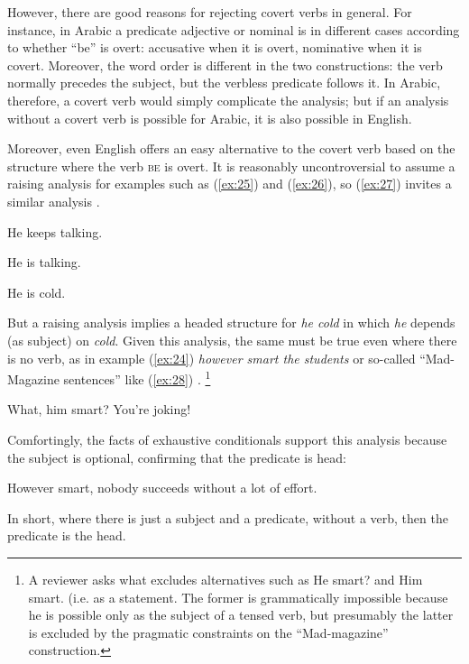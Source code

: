 \documentclass[output=paper]{langscibook}
\begin{document}
However, there are good reasons for rejecting covert verbs in general. For instance, in Arabic a predicate adjective or nominal is in different cases according to whether ``be'' is overt: accusative when it is overt, nominative when it is covert. Moreover, the word order is different in the two constructions: the verb normally precedes the subject, but the verbless predicate follows it. In Arabic, therefore, a covert verb would simply complicate the analysis; but if an analysis without a covert verb is possible for Arabic, it is also possible in English.

Moreover, even English offers an easy alternative to the covert verb based on the structure where the verb \textsc{be} is overt. It is reasonably uncontroversial to assume a raising analysis for examples such as (\ref{ex:25}) and (\ref{ex:26}), so (\ref{ex:27}) invites a similar analysis \citep{MuellerCopula}.

\eal
\ex \label{ex:25} He keeps talking.

\ex \label{ex:26} He is talking.

\ex \label{ex:27} He is cold.
\zl

But a raising analysis implies a headed structure for \emph{he cold} in which \emph{he} depends (as subject) on \emph{cold}. Given this analysis, the same must be true even where there is no verb, as in example (\ref{ex:24}) \emph{however smart the students} or so-called ``Mad-Magazine sentences'' like (\ref{ex:28}) \citep{Lambrecht:90}.%
%
\footnote{A reviewer asks what excludes alternatives such as He smart? and Him smart. (i.e. as a statement. The former is grammatically impossible because he is possible only as the subject of a tensed verb, but presumably the latter is excluded by the pragmatic constraints on the ``Mad-magazine'' construction.}%
%

\begin{exe}
	\ex \label{ex:28} What, him smart? You’re joking!
\end{exe}

Comfortingly, the facts of exhaustive conditionals support this analysis because the subject is optional, confirming that the predicate is head:

\begin{exe}
	\ex \label{ex:29} However smart, nobody succeeds without a lot of effort.
\end{exe}

In short, where there is just a subject and a predicate, without a verb, then the predicate is the head.
\end{document}
